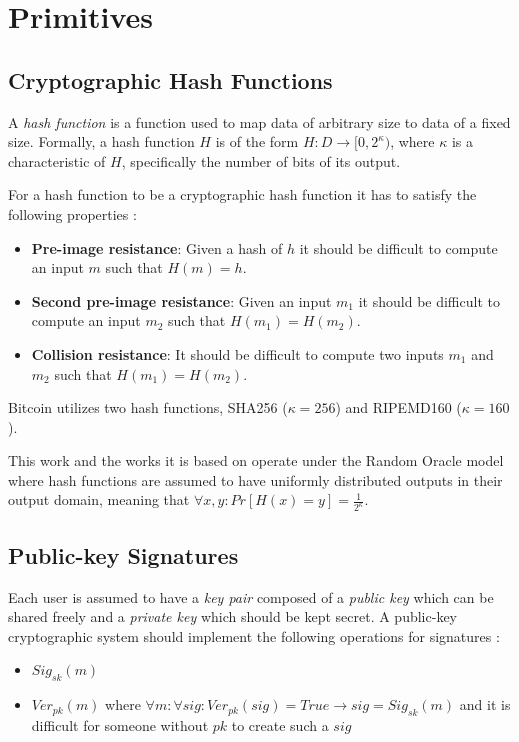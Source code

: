 \section{Primitives}
\subsection{Cryptographic Hash Functions}
A \textit{hash function} is a function used to map data of arbitrary size to data of a fixed size. Formally, a hash function $H$ is of the form $H: D \rightarrow [0, 2^\kappa)$, where $\kappa$ is a characteristic of $H$, specifically the number of bits of its output.

For a hash function to be a cryptographic hash function it has to satisfy the following properties \cite{katz}:
\begin{itemize}
  \item \textbf{Pre-image resistance}: Given a hash of $h$ it should be difficult to compute an input $m$ such that $H(m) = h$.
  \item \textbf{Second pre-image resistance}: Given an input $m_1$ it should be difficult to compute an input $m_2$ such that $H(m_1) = H(m_2)$.
  \item \textbf{Collision resistance}: It should be difficult to compute two inputs $m_1$ and $m_2$ such that $H(m_1) = H(m_2)$.
\end{itemize}

Bitcoin utilizes two hash functions, SHA256 ($\kappa=256$) and RIPEMD160 ($\kappa=160$).

This work and the works it is based on \cite{nipopows} operate under the Random Oracle model where hash functions are assumed to have uniformly distributed outputs in their output domain, meaning that $\forall x, y: Pr[H(x) = y] = \frac{1}{2^\kappa}$.

\subsection{Public-key Signatures}
Each user is assumed to have a \textit{key pair} composed of a \textit{public key} which can be shared freely and a \textit{private key} which should be kept secret. A public-key cryptographic system should implement the following operations for signatures \cite{katz}:

\begin{itemize}
  \item $Sig_{sk}(m)$
  \item $Ver_{pk}(m)$ where $\forall m: \forall sig: Ver_{pk}(sig) = True \rightarrow sig = Sig_{sk}(m)$ and it is difficult for someone without $pk$ to create such a $sig$
\end{itemize}

